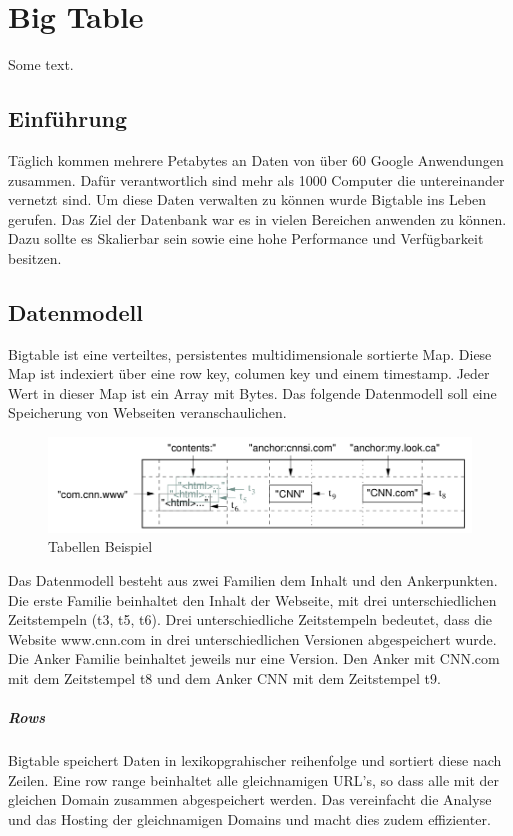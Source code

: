 \chapter{Big Table}
\label{bigTable}
Some text.

\section{Einführung}
Täglich kommen mehrere Petabytes an Daten von über 60 Google Anwendungen zusammen. Dafür verantwortlich sind mehr als 1000 Computer die untereinander vernetzt sind. Um diese Daten verwalten zu können wurde Bigtable ins Leben gerufen. Das Ziel der Datenbank war es in vielen Bereichen anwenden zu können. Dazu sollte es Skalierbar sein sowie eine hohe Performance und Verfügbarkeit besitzen.


\section{Datenmodell}
Bigtable ist eine verteiltes, persistentes multidimensionale sortierte Map. Diese Map ist indexiert über eine row key, columen key und einem timestamp. Jeder Wert in dieser Map ist ein Array mit Bytes. Das folgende Datenmodell soll eine Speicherung von Webseiten veranschaulichen.

\begin{figure}[!htpb]
	\centering
	\includegraphics[]{pics/bigtable_schema.png}
	\caption {Tabellen Beispiel}	
\end{figure}

Das Datenmodell besteht aus zwei Familien dem Inhalt und den Ankerpunkten. Die erste Familie beinhaltet den Inhalt der Webseite, mit drei unterschiedlichen Zeitstempeln (t3, t5, t6). Drei unterschiedliche Zeitstempeln bedeutet, dass die Website www.cnn.com in drei unterschiedlichen Versionen abgespeichert wurde. Die Anker Familie beinhaltet jeweils nur eine Version. Den Anker mit \glqq CNN.com \grqq mit dem Zeitstempel t8 und dem Anker \glqq CNN \grqq mit dem Zeitstempel t9. 
 
\paragraph{Rows}
Bigtable speichert Daten in lexikopgrahischer reihenfolge und sortiert diese nach Zeilen. Eine row range beinhaltet alle gleichnamigen URL’s, so dass alle mit der gleichen Domain zusammen abgespeichert werden. Das vereinfacht die Analyse und das Hosting der gleichnamigen Domains und macht dies zudem effizienter.

